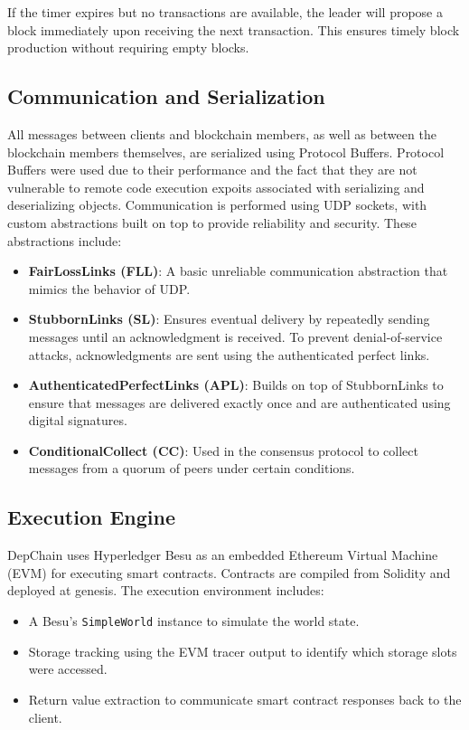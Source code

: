 \documentclass[runningheads]{llncs}
\begin{document}
If the timer expires but no transactions are available, the leader will propose a block immediately upon receiving the next transaction. This ensures timely block production without requiring empty blocks.

\subsection{Communication and Serialization}

All messages between clients and blockchain members, as well as between the blockchain members themselves, are serialized using Protocol Buffers. Protocol Buffers were used due to their performance and the fact that they are not vulnerable to remote code execution expoits associated with serializing and deserializing objects. Communication is performed using UDP sockets, with custom abstractions built on top to provide reliability and security. These abstractions include:

\begin{itemize}
    \item \textbf{FairLossLinks (FLL)}: A basic unreliable communication abstraction that mimics the behavior of UDP.
    \item \textbf{StubbornLinks (SL)}: Ensures eventual delivery by repeatedly sending messages until an acknowledgment is received. To prevent denial-of-service attacks, acknowledgments are sent using the authenticated perfect links.
    \item \textbf{AuthenticatedPerfectLinks (APL)}: Builds on top of StubbornLinks to ensure that messages are delivered exactly once and are authenticated using digital signatures.
    \item \textbf{ConditionalCollect (CC)}: Used in the consensus protocol to collect messages from a quorum of peers under certain conditions.
\end{itemize}

\subsection{Execution Engine}

DepChain uses Hyperledger Besu as an embedded Ethereum Virtual Machine (EVM) for executing smart contracts. Contracts are compiled from Solidity and deployed at genesis. The execution environment includes:

\begin{itemize}
    \item A Besu's \texttt{SimpleWorld} instance to simulate the world state.
    \item Storage tracking using the EVM tracer output to identify which storage slots were accessed.
    \item Return value extraction to communicate smart contract responses back to the client.
\end{itemize}
\end{document}
